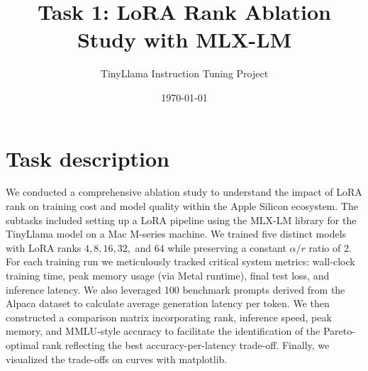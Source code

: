 \documentclass[10pt,a4paper]{article}
\title{\textbf{Task 1: LoRA Rank Ablation Study with MLX-LM}}
\author{TinyLlama Instruction Tuning Project}
\date{\today}
\begin{document}
\maketitle
\vspace{-1em}

\section*{Task description}
We conducted a comprehensive ablation study to understand the impact of LoRA rank on training cost and model quality within the Apple Silicon ecosystem. The subtasks included setting up a LoRA pipeline using the MLX-LM library for the TinyLlama model on a Mac M-series machine. We trained five distinct models with LoRA ranks $4, 8, 16, 32,$ and $64$ while preserving a constant $\alpha/r$ ratio of 2. For each training run we meticulously tracked critical system metrics: wall-clock training time, peak memory usage (via Metal runtime), final test loss, and inference latency. We also leveraged 100 benchmark prompts derived from the Alpaca dataset to calculate average generation latency per token. We then constructed a comparison matrix incorporating rank, inference speed, peak memory, and MMLU-style accuracy to facilitate the identification of the Pareto-optimal rank reflecting the best accuracy-per-latency trade-off. Finally, we visualized the trade-offs on curves with matplotlib.
\end{document}
